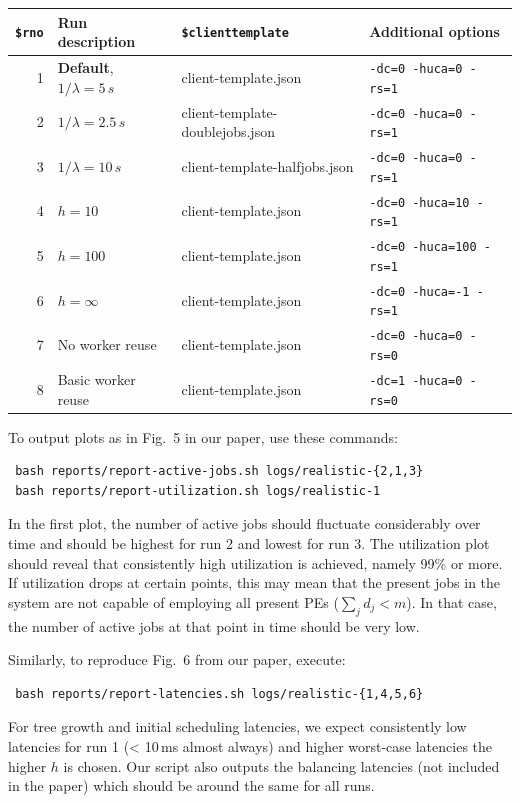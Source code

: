 \documentclass[runningheads]{article}
\numberwithin{dummy}{subsection}
\begin{document}
{
\begin{tabular}{|r|l|l|l|}
\hline
\texttt{\$rno} & Run description & \texttt{\$clienttemplate} & Additional options \\
\hline
1 & \textbf{Default}, $1/\lambda=5\,s$ & client-template.json & \texttt{-dc=0 -huca=0 -rs=1} \\
2 & $1/\lambda=2.5\,s$ & client-template-doublejobs.json & \texttt{-dc=0 -huca=0 -rs=1} \\
3 & $1/\lambda=10\,s$ & client-template-halfjobs.json & \texttt{-dc=0 -huca=0 -rs=1} \\
\hline
4 & $h=10$ & client-template.json & \texttt{-dc=0 -huca=10 -rs=1} \\
5 & $h=100$ & client-template.json & \texttt{-dc=0 -huca=100 -rs=1} \\
6 & $h=\infty$ & client-template.json & \texttt{-dc=0 -huca=-1 -rs=1} \\
\hline
7 & No worker reuse & client-template.json & \texttt{-dc=0 -huca=0 -rs=0} \\
8 & Basic worker reuse & client-template.json & \texttt{-dc=1 -huca=0 -rs=0} \\
\hline
\end{tabular}
}
\vspace{0.4cm}


To output plots as in Fig.~5 in our paper, use these commands:
\begin{verbatim}
 bash reports/report-active-jobs.sh logs/realistic-{2,1,3}
 bash reports/report-utilization.sh logs/realistic-1
\end{verbatim}
In the first plot, the number of active jobs should fluctuate considerably over time and should be highest for run 2 and lowest for run 3.
The utilization plot should reveal that consistently high utilization is achieved, namely 99\% or more.
If utilization drops at certain points, this may mean that the present jobs in the system are not capable of employing all present PEs ($\sum_j d_j < m$).
In that case, the number of active jobs at that point in time should be very low.

Similarly, to reproduce Fig.~6 from our paper, execute:
\begin{verbatim}
 bash reports/report-latencies.sh logs/realistic-{1,4,5,6}
\end{verbatim}
For tree growth and initial scheduling latencies, we expect consistently low latencies for run 1 (< 10\,ms almost always) and higher worst-case latencies the higher $h$ is chosen.
Our script also outputs the balancing latencies (not included in the paper) which should be around the same for all runs.
\end{document}
